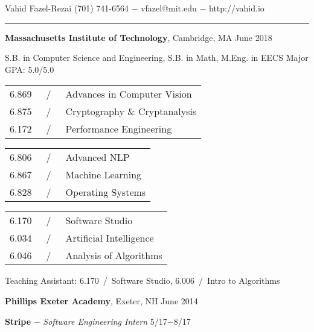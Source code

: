 \documentclass[11pt]{article}
\newcommand{\msection}[1]{\vspace{1em}\marginnote{#1}} %
\newcommand{\bt}[1]{\textbf{#1}} %
\newcommand{\gap}[0]{\vspace{0.7em}} %
\newcommand{\sgap}[0]{\vspace{0.2em}} %
\newcommand{\dash}[0]{ $-$ } %
\newcommand{\tabsep}[0]{\, / \,} %
\begin{document}

{\Huge Vahid Fazel-Rezai} \hfill  (701) 741-6564\dash vfazel@mit.edu\dash http://vahid.io

\vspace{0.4em}

\hspace{-1.2in}\rule{7.9in}{0.2em}

\vspace{-0.2em}



\msection{Education}

\bt{Massachusetts Institute of Technology}, Cambridge, MA \hfill June 2018

S.B. in Computer Science and Engineering, S.B. in Math, M.Eng. in EECS \hfill Major GPA: 5.0/5.0

\sgap

\vspace{0.15em}
\begin{tabular}{rcl}
6.869 & \tabsep & Advances in Computer Vision \\
6.875 & \tabsep & Cryptography \& Cryptanalysis \\
6.172 & \tabsep & Performance Engineering \\
\end{tabular}
\hfill
\begin{tabular}{rcl}
6.806 & \tabsep & Advanced NLP \\
6.867 & \tabsep & Machine Learning \\
6.828 & \tabsep & Operating Systems \\
\end{tabular}
\hfill
\begin{tabular}{rcl}
6.170 & \tabsep & Software Studio \\
6.034 & \tabsep & Artificial Intelligence \\
6.046 & \tabsep & Analysis of Algorithms \\
\end{tabular}

\sgap

Teaching Assistant: 6.170\tabsep Software Studio, 6.006\tabsep Intro to Algorithms

\gap

\bt{Phillips Exeter Academy}, Exeter, NH \hfill June 2014



\msection{Work}

\bt{Stripe}\dash \emph{Software Engineering Intern} \hfill 5/17$-$8/17
\end{document}
